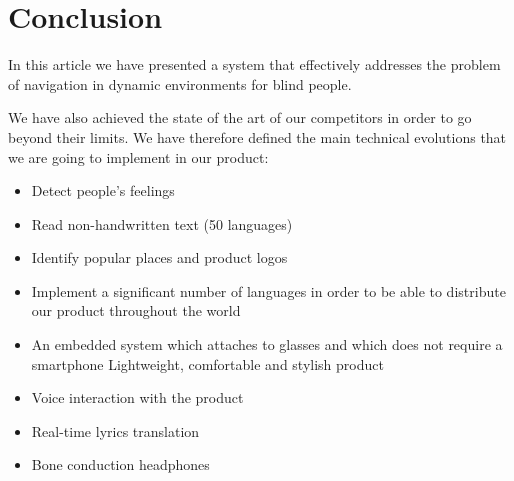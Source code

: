 \documentclass[conference,compsoc]{IEEEtran}
\begin{document}
\section{Conclusion}
In this article we have presented a system that effectively addresses the problem of navigation in dynamic environments for blind people.

We have also achieved the state of the art of our competitors in order to go beyond their limits.
We have therefore defined the main technical evolutions that we are going to implement in our product:
\begin{itemize}
  \item Detect people's feelings
  \item Read non-handwritten text (50 languages)
  \item Identify popular places and product logos
  \item Implement a significant number of languages in order to be able to distribute our product throughout the world
  \item An embedded system which attaches to glasses and which does not require a smartphone
Lightweight, comfortable and stylish product
  \item Voice interaction with the product
  \item Real-time lyrics translation
  \item Bone conduction headphones
\end{itemize}






%
% 

\end{document}
